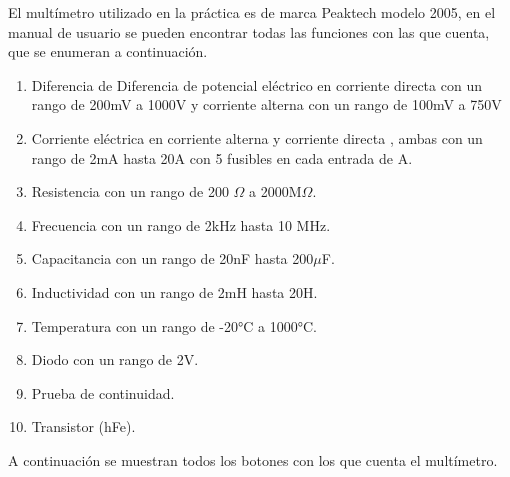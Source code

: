 \documentclass[10pt]{article}
\begin{document}
\begin{multicols}{2}
El multímetro utilizado en la práctica es de marca Peaktech modelo 2005, en el manual de usuario se pueden encontrar todas las funciones con las que cuenta, que se enumeran a continuación.

\begin{enumerate}
	\item Diferencia de Diferencia de potencial eléctrico en corriente directa con un rango de 200mV a 1000V y corriente alterna con un rango de 100mV a 750V
	\item Corriente eléctrica en corriente alterna y corriente directa , ambas con un rango de 2mA hasta 20A con 5 fusibles en cada entrada de A.
	\item Resistencia con un rango de 200 $\Omega$ a 2000M$\Omega$.
	\item Frecuencia con un rango de 2kHz hasta 10 MHz.
	\item Capacitancia con un rango de 20nF hasta 200$\mu$F.
	\item Inductividad con un rango de 2mH hasta 20H.
	\item Temperatura con un rango de -20°C a 1000°C.
	\item Diodo con un rango de 2V.
	\item Prueba de continuidad.
	\item Transistor (hFe).
\end{enumerate}

A continuación se muestran todos los botones con los que cuenta el multímetro. 


\end{multicols}
\end{document}
